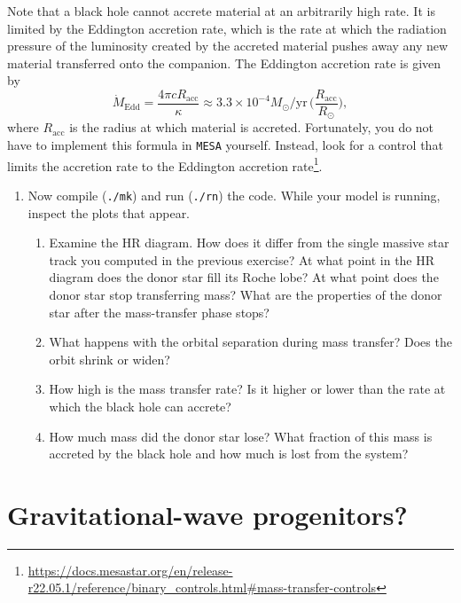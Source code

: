 \documentclass[11pt,a4paper]{article}
\begin{document}
  \noindent
  Note that a black hole cannot accrete material at an arbitrarily high rate. It is limited by the Eddington accretion rate, which is the rate at which the radiation pressure of the luminosity created by the accreted material pushes away any new material transferred onto the companion. The Eddington accretion rate is given by
  \begin{equation*}
  \dot{M}_{\mathrm{Edd}} = \frac{4\pi cR_{\mathrm{acc}}}{\kappa} \approx 3.3 \times 10^{-4} M_\odot/\mathrm{yr}\, \bigg(\frac{R_{\mathrm{acc}}}{R_\odot}\bigg),
  \end{equation*}
  where $R_{\mathrm{acc}}$ is the radius at which material is accreted. Fortunately, you do not have to implement this formula in \texttt{MESA} yourself. Instead, look for a control that limits the accretion rate to the Eddington accretion rate\footnote{\url{https://docs.mesastar.org/en/release-r22.05.1/reference/binary_controls.html\#mass-transfer-controls}}.

  \begin{enumerate}
  \addtocounter{enumi}{2}
  \item Now compile (\verb|./mk|) and run (\verb|./rn|) the code. While your model is running, inspect the plots that appear.
  \begin{enumerate}
  \item Examine the HR diagram. How does it differ from the single massive star track you computed in the previous exercise? At what point in the HR diagram does the donor star fill its Roche lobe? At what point does the donor star stop transferring mass? What are the properties of the donor star after the mass-transfer phase stops?
  \item What happens with the orbital separation during mass transfer? Does the orbit shrink or widen?
  \item How high is the mass transfer rate? Is it higher or lower than the rate at which the black hole can accrete?
  \item How much mass did the donor star lose? What fraction of this mass is accreted by the black hole and how much is lost from the system?
  \end{enumerate}

\end{enumerate}


\section{Gravitational-wave progenitors?}
\end{document}
